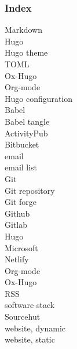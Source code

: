 \documentclass[11pt]{article}
\begin{document}
\subsubsection*{Index}
\label{sec:org4180f04}
\begin{description}
\item[{Markdown}]

\item[{Hugo}]

\item[{Hugo theme}]

\item[{TOML}]

\item[{Ox-Hugo}]

\item[{Org-mode}]

\item[{Hugo configuration}]

\item[{Babel}]

\item[{Babel tangle}]

\item[{ActivityPub}]

\item[{Bitbucket}]

\item[{email}]

\item[{email list}]

\item[{Git}]

\item[{Git repository}]

\item[{Git forge}]

\item[{Github}]

\item[{Gitlab}]

\item[{Hugo}]

\item[{Microsoft}]

\item[{Netlify}]

\item[{Org-mode}]

\item[{Ox-Hugo}]

\item[{RSS}]

\item[{software stack}]

\item[{Sourcehut}]

\item[{website, dynamic}]

\item[{website, static}]
\end{description}
\end{document}
